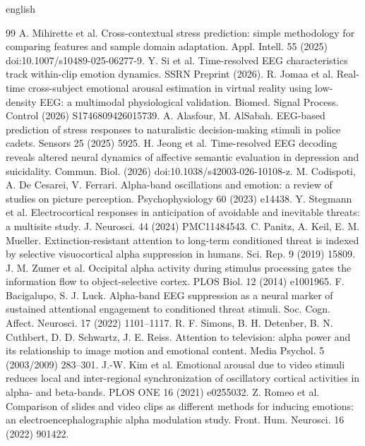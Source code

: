 \documentclass[10pt]{article}
\begin{document}
\begin{otherlanguage*}{english}
\begin{thebibliography}{99}
 A. Mihirette et al. Cross-contextual stress prediction: simple methodology for comparing features and sample domain adaptation. Appl. Intell. 55 (2025) doi:10.1007/s10489-025-06277-9.
 Y. Si et al. Time-resolved EEG characteristics track within-clip emotion dynamics. SSRN Preprint (2026).
 R. Jomaa et al. Real-time cross-subject emotional arousal estimation in virtual reality using low-density EEG: a multimodal physiological validation. Biomed. Signal Process. Control (2026) S1746809426015739.
 A. Alasfour, M. AlSabah. EEG-based prediction of stress responses to naturalistic decision-making stimuli in police cadets. Sensors 25 (2025) 5925.
 H. Jeong et al. Time-resolved EEG decoding reveals altered neural dynamics of affective semantic evaluation in depression and suicidality. Commun. Biol. (2026) doi:10.1038/s42003-026-10108-z.
 M. Codispoti, A. De Cesarei, V. Ferrari. Alpha-band oscillations and emotion: a review of studies on picture perception. Psychophysiology 60 (2023) e14438.
 Y. Stegmann et al. Electrocortical responses in anticipation of avoidable and inevitable threats: a multisite study. J. Neurosci. 44 (2024) PMC11484543.
 C. Panitz, A. Keil, E. M. Mueller. Extinction-resistant attention to long-term conditioned threat is indexed by selective visuocortical alpha suppression in humans. Sci. Rep. 9 (2019) 15809.
 J. M. Zumer et al. Occipital alpha activity during stimulus processing gates the information flow to object-selective cortex. PLOS Biol. 12 (2014) e1001965.
 F. Bacigalupo, S. J. Luck. Alpha-band EEG suppression as a neural marker of sustained attentional engagement to conditioned threat stimuli. Soc. Cogn. Affect. Neurosci. 17 (2022) 1101--1117.
 R. F. Simons, B. H. Detenber, B. N. Cuthbert, D. D. Schwartz, J. E. Reiss. Attention to television: alpha power and its relationship to image motion and emotional content. Media Psychol. 5 (2003/2009) 283--301.
 J.-W. Kim et al. Emotional arousal due to video stimuli reduces local and inter-regional synchronization of oscillatory cortical activities in alpha- and beta-bands. PLOS ONE 16 (2021) e0255032.
 Z. Romeo et al. Comparison of slides and video clips as different methods for inducing emotions: an electroencephalographic alpha modulation study. Front. Hum. Neurosci. 16 (2022) 901422.

\end{thebibliography}
\end{otherlanguage*}
\end{document}
